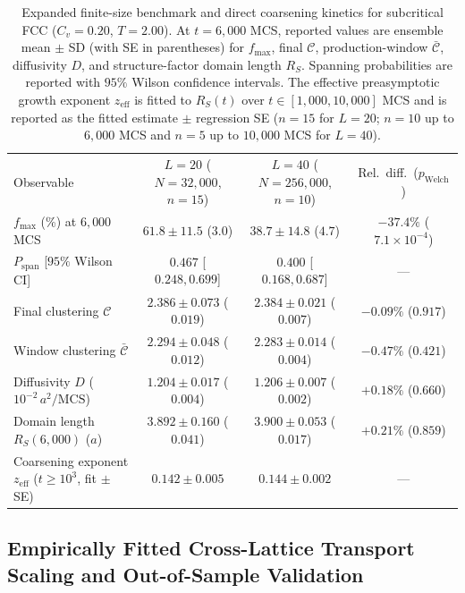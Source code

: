 \documentclass[aps,pre,reprint,superscriptaddress,amsmath,amssymb,floatfix]{revtex4-2}
\begin{document}
\begin{table}[t]
\caption{\label{tab:finite_size}Expanded finite-size benchmark and direct coarsening kinetics for subcritical FCC ($C_v = 0.20$, $T = 2.00$). At $t = 6{,}000$ MCS, reported values are ensemble mean $\pm$ SD (with SE in parentheses) for $f_{\max}$, final $\mathcal{C}$, production-window $\bar{\mathcal{C}}$, diffusivity $D$, and structure-factor domain length $R_S$. Spanning probabilities are reported with $95\%$ Wilson confidence intervals. The effective preasymptotic growth exponent $z_{\mathrm{eff}}$ is fitted to $R_S(t)$ over $t \in [1{,}000, 10{,}000]$ MCS and is reported as the fitted estimate $\pm$ regression SE ($n = 15$ for $L = 20$; $n = 10$ up to $6{,}000$ MCS and $n = 5$ up to $10{,}000$ MCS for $L = 40$).}
\begingroup
\footnotesize
\setlength{\tabcolsep}{5pt}
\begin{ruledtabular}
\begin{tabular}{lccc}
Observable & $L = 20$ ($N = 32{,}000$, $n = 15$) & $L = 40$ ($N = 256{,}000$, $n = 10$) & Rel.\ diff.\ ($p_{\mathrm{Welch}}$) \\
\colrule
$f_{\max}$ (\%) at $6{,}000$ MCS & $61.8 \pm 11.5$ ($3.0$) & $38.7 \pm 14.8$ ($4.7$) & $-37.4\%$ ($7.1 \times 10^{-4}$) \\
$P_{\mathrm{span}}$ [$95\%$ Wilson CI] & $0.467$ [$0.248, 0.699$] & $0.400$ [$0.168, 0.687$] & --- \\
Final clustering $\mathcal{C}$ & $2.386 \pm 0.073$ ($0.019$) & $2.384 \pm 0.021$ ($0.007$) & $-0.09\%$ ($0.917$) \\
Window clustering $\bar{\mathcal{C}}$ & $2.294 \pm 0.048$ ($0.012$) & $2.283 \pm 0.014$ ($0.004$) & $-0.47\%$ ($0.421$) \\
Diffusivity $D$ ($10^{-2}\,a^2/\mathrm{MCS}$) & $1.204 \pm 0.017$ ($0.004$) & $1.206 \pm 0.007$ ($0.002$) & $+0.18\%$ ($0.660$) \\
Domain length $R_S(6{,}000)$ ($a$) & $3.892 \pm 0.160$ ($0.041$) & $3.900 \pm 0.053$ ($0.017$) & $+0.21\%$ ($0.859$) \\
Coarsening exponent $z_{\mathrm{eff}}$ ($t \geq 10^3$, fit $\pm$ SE) & $0.142 \pm 0.005$ & $0.144 \pm 0.002$ & --- \\
\end{tabular}
\end{ruledtabular}
\endgroup
\end{table}

\subsection{Empirically Fitted Cross-Lattice Transport Scaling and Out-of-Sample Validation}
\label{sec:reduced_scaling}
\end{document}
